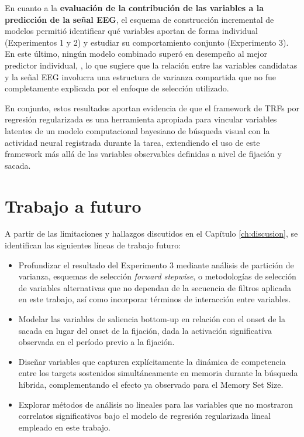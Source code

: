 En cuanto a la \textbf{evaluación de la contribución de las variables a la predicción de la señal EEG}, el esquema de construcción incremental de modelos permitió identificar qué variables aportan de forma individual (Experimentos 1 y 2) y estudiar su comportamiento conjunto (Experimento 3). En este último, ningún modelo combinado superó en desempeño al mejor predictor individual, , lo que sugiere que la relación entre las variables candidatas y la señal EEG involucra una estructura de varianza compartida que no fue completamente explicada por el enfoque de selección utilizado.

En conjunto, estos resultados aportan evidencia de que el framework de TRFs por regresión regularizada es una herramienta apropiada para vincular variables latentes de un modelo computacional bayesiano de búsqueda visual con la actividad neural registrada durante la tarea, extendiendo el uso de este framework más allá de las variables observables definidas a nivel de fijación y sacada.

\section*{Trabajo a futuro}

A partir de las limitaciones y hallazgos discutidos en el Capítulo \ref{ch:discusion}, se identifican las siguientes líneas de trabajo futuro:

\begin{itemize}
    \item Profundizar el resultado del Experimento 3 mediante análisis de partición de varianza, esquemas de selección \textit{forward stepwise}, o metodologías de selección de variables alternativas que no dependan de la secuencia de filtros aplicada en este trabajo, así como incorporar términos de interacción entre variables.
    \item Modelar las variables de saliencia bottom-up en relación con el onset de la sacada en lugar del onset de la fijación, dada la activación significativa observada en el período previo a la fijación.
    \item Diseñar variables que capturen explícitamente la dinámica de competencia entre los targets sostenidos simultáneamente en memoria durante la búsqueda híbrida, complementando el efecto ya observado para el Memory Set Size.
    \item Explorar métodos de análisis no lineales para las variables que no mostraron correlatos significativos bajo el modelo de regresión regularizada lineal empleado en este trabajo.
\end{itemize}